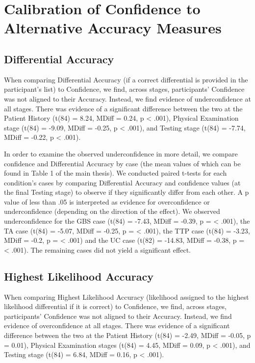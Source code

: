 \documentclass[a4paper, nobind]{templates/ociamthesis}
\begin{document}
\newpage

\section{Calibration of Confidence to Alternative Accuracy Measures}\label{calibrations}

\subsection{Differential Accuracy}\label{differential-accuracy}

When comparing Differential Accuracy (if a correct differential is provided in the participant's list) to Confidence, we find, across stages, participants' Confidence was not aligned to their Accuracy. Instead, we find evidence of underconfidence at all stages. There was evidence of a significant difference between the two at the Patient History (t(84) = 8.24, MDiff = 0.24, p \textless{} .001), Physical Examination stage (t(84) = -9.09, MDiff = -0.25, p \textless{} .001), and Testing stage (t(84) = -7.74, MDiff = -0.22, p \textless{} .001).

In order to examine the observed underconfidence in more detail, we compare confidence and Differential Accuracy by case (the mean values of which can be found in Table 1 of the main thesis). We conducted paired t-tests for each condition's cases by comparing Differential Accuracy and confidence values (at the final Testing stage) to observe if they significantly differ from each other. A p value of less than .05 is interpreted as evidence for overconfidence or underconfidence (depending on the direction of the effect). We observed underconfidence for the GBS case (t(84) = -7.43, MDiff = -0.39, p = \textless{} .001), the TA case (t(84) = -5.07, MDiff = -0.25, p = \textless{} .001), the TTP case (t(84) = -3.23, MDiff = -0.2, p = \textless{} .001) and the UC case (t(82) = -14.83, MDiff = -0.38, p = \textless{} .001). The remaining cases did not yield a significant effect.

\subsection{Highest Likelihood Accuracy}\label{highest-likelihood-accuracy}

When comparing Highest Likelihood Accuracy (likelihood assigned to the highest likelihood differential if it is correct) to Confidence, we find, across stages, participants' Confidence was not aligned to their Accuracy. Instead, we find evidence of overconfidence at all stages. There was evidence of a significant difference between the two at the Patient History (t(84) = -2.49, MDiff = -0.05, p = 0.01), Physical Examination stages (t(84) = 4.45, MDiff = 0.09, p \textless{} .001), and Testing stage (t(84) = 6.84, MDiff = 0.16, p \textless{} .001).
\end{document}
